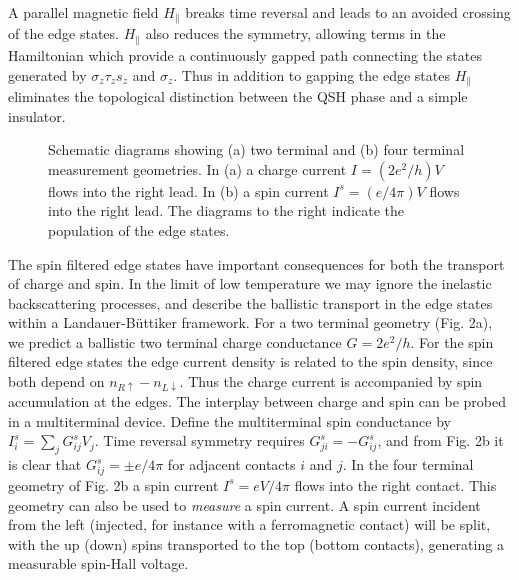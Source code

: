 \documentclass[twocolumn,showpacs,floatfix,prl]{revtex4}
\begin{document}
A parallel magnetic field $H_\parallel$ breaks time reversal and leads to
an avoided crossing of the edge states.  $H_\parallel$ also reduces
the symmetry, allowing
terms in the Hamiltonian which provide a continuously gapped path
connecting the states generated by $\sigma_z\tau_z s_z$ and $\sigma_z$.
Thus in addition to gapping the edge states
$H_\parallel$ eliminates the topological distinction between the QSH phase
and a simple insulator.

\begin{figure}
 \centerline{  }
 \caption{Schematic diagrams showing (a) two terminal and (b) four terminal measurement
 geometries.  In (a) a charge current $I=(2e^2/h)V$ flows into the right lead.
 In (b) a spin current $I^s=(e/4\pi)V$ flows into the right lead.  The diagrams to
 the right indicate the population of the edge states.}
 \end{figure}

The spin filtered edge states have important consequences for
both the transport of charge and spin. In the limit of low temperature
we may ignore the inelastic
backscattering processes, and describe the ballistic transport in the
edge states within a Landauer-B\"uttiker\cite{buettiker} framework.
For a two terminal geometry (Fig. 2a), we predict a ballistic two terminal charge
conductance $G = 2 e^2/h$.  For the spin filtered edge states
the edge current density is related to the spin density, since both
depend on $n_{R\uparrow}-n_{L\downarrow}$.
Thus the charge current is accompanied by spin accumulation at the edges.
The interplay between charge and spin can be probed in a
multiterminal device.  Define the multiterminal
spin conductance by $I^s_i = \sum_j
G^s_{ij}V_j$.  Time reversal symmetry requires
$G^s_{ji} = - G^s_{ij}$, and from Fig. 2b it is clear that
$G^s_{ij} = \pm e/4\pi$ for adjacent contacts $i$ and $j$.
In the four terminal geometry of Fig. 2b a spin  current $I^s = eV/4\pi$
flows into the right contact.  This geometry can also be used to {\it
measure} a spin current.  A spin current incident from the left (injected, for
instance with a ferromagnetic contact) will
be split, with the up (down) spins transported to the top (bottom
contacts), generating a measurable spin-Hall voltage.
\end{document}
